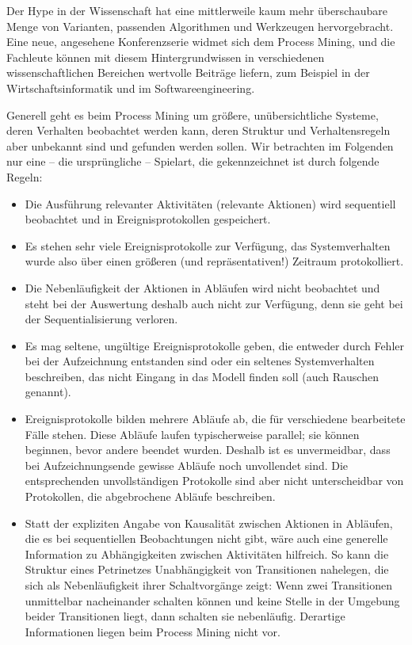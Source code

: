 Der Hype in der Wissenschaft hat eine mittlerweile kaum mehr überschaubare Menge von Varianten, passenden Algorithmen und Werkzeugen hervorgebracht. Eine neue, angesehene Konferenzserie widmet sich dem Process Mining, und die Fachleute können mit diesem Hintergrundwissen in verschiedenen wissenschaftlichen Bereichen wertvolle Beiträge liefern, zum Beispiel in der Wirtschaftsinformatik und im Softwareengineering.

Generell geht es beim Process Mining um größere, unübersichtliche Systeme, 
deren Verhalten beobachtet werden kann, deren Struktur und Verhaltensregeln aber unbekannt sind und gefunden werden sollen.
Wir betrachten im Folgenden nur eine -- die ursprüngliche -- Spielart, die gekennzeichnet ist durch folgende Regeln:

\begin{itemize}
	\item Die Ausführung relevanter Aktivitäten (relevante Aktionen) wird sequentiell beobachtet und in Ereignisprotokollen gespeichert.
	\item Es stehen sehr viele Ereignisprotokolle zur Verfügung, das Systemverhalten wurde also über einen größeren (und repräsentativen!) Zeitraum protokolliert.
	\item Die Nebenläufigkeit der Aktionen in Abläufen wird nicht beobachtet und steht bei der Auswertung deshalb auch nicht zur Verfügung, denn sie geht bei der Sequentialisierung verloren.
	\item Es mag seltene, ungültige Ereignisprotokolle geben, die entweder durch Fehler bei der Aufzeichnung entstanden sind oder ein seltenes Systemverhalten beschreiben, das nicht Eingang in das Modell finden soll (auch Rauschen genannt).
	\item Ereignisprotokolle bilden mehrere Abläufe ab, die für verschiedene bearbeitete Fälle stehen. Diese Abläufe laufen typischerweise parallel; sie können beginnen, bevor andere beendet wurden. Deshalb ist es unvermeidbar, dass bei Aufzeichnungsende gewisse Abläufe noch unvollendet sind. Die entsprechenden unvollständigen Protokolle sind aber nicht unterscheidbar von Protokollen, die abgebrochene Abläufe beschreiben.
	\item Statt der expliziten Angabe von Kausalität zwischen Aktionen in Abläufen, die es bei sequentiellen Beobachtungen nicht gibt, wäre auch eine generelle Information zu Abhängigkeiten zwischen Aktivitäten hilfreich. So kann die Struktur eines Petrinetzes Unabhängigkeit von Transitionen nahelegen, die sich als Nebenläufigkeit ihrer Schaltvorgänge zeigt: Wenn zwei Transitionen unmittelbar nacheinander schalten können und keine Stelle in der Umgebung beider Transitionen liegt, dann schalten sie nebenläufig. Derartige Informationen liegen beim Process Mining nicht vor.
\end{itemize}

